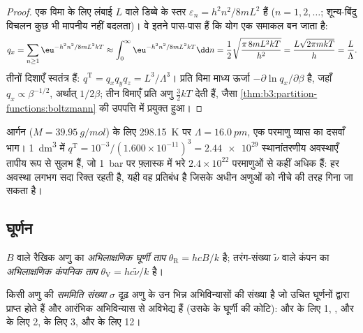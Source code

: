 \begin{proof}
एक विमा के लिए लंबाई $L$ वाले डिब्बे के स्तर $\varepsilon_n = h^2n^2/8mL^2$ हैं
($n = 1, 2, \dots$; शून्य-बिंदु विचलन कुछ भी मापनीय नहीं बदलता)। वे इतने
पास-पास हैं कि योग एक समाकल बन जाता है:
\[
  q_x = \sum_{n\ge1}\eu^{-h^2n^2/8mL^2kT} \approx \int_0^\infty\eu^{-h^2n^2/8mL^2kT}\dd n
      = \frac12\sqrt{\frac{\pi\,8mL^2kT}{h^2}} = \frac{L\sqrt{2\pi mkT}}{h} = \frac{L}{\Lambda}.
\]
तीनों दिशाएँ स्वतंत्र हैं: $q^{\mathrm T} = q_xq_yq_z = L^3/\Lambda^3$। प्रति
विमा माध्य ऊर्जा $-\partial\ln q_x/\partial\beta$ है, जहाँ $q_x \propto \beta^{-1/2}$, अर्थात्
$1/2\beta$; तीन विमाएँ प्रति अणु $\frac32kT$ देती हैं, जैसा
\cref{thm:b3:partition-functions:boltzmann} की उपपत्ति में प्रयुक्त हुआ।
\end{proof}

\begin{example}[फ़्लास्क में आर्गन]\label{ex:b3:partition-functions:argon}
आर्गन ($M = \qty{39.95}{g/mol}$) के लिए \qty{298.15}{K} पर $\Lambda = \qty{16.0}{pm}$, एक
परमाणु व्यास का दसवाँ भाग। \qty{1}{dm^3} में $q^{\mathrm T} = 10^{-3}/(1.600\times10^{-11})^3 = \num{2.44e29}$
स्थानांतरणीय अवस्थाएँ तापीय रूप से सुलभ हैं, जो
\qty{1}{bar} पर फ़्लास्क में भरे $2.4\times10^{22}$ परमाणुओं से कहीं अधिक हैं: हर अवस्था लगभग सदा
रिक्त रहती है, यही वह प्रतिबंध है जिसके अधीन अणुओं को नीचे की तरह गिना जा सकता है।
\end{example}

\subsection*{घूर्णन}

\begin{definition}[अभिलाक्षणिक ताप]\label{def:b3:partition-functions:characteristic-temperature}
 $B$ वाले रैखिक अणु का \emph{अभिलाक्षणिक घूर्णी ताप}
$\theta_{\mathrm R} =
hcB/k$ है; तरंग-संख्या $\tilde\nu$ वाले कंपन का \emph{अभिलाक्षणिक कंपनिक ताप}
$\theta_{\mathrm V} =
hc\tilde\nu/k$ है।
\end{definition}

\begin{definition}[सममिति संख्या]\label{def:b3:partition-functions:symmetry-number}
किसी अणु की \emph{सममिति संख्या} $\sigma$ दृढ़ अणु के उन
भिन्न अभिविन्यासों की संख्या है जो उचित घूर्णनों द्वारा प्राप्त होते हैं और
आरंभिक अभिविन्यास से अविभेद्य हैं (उसके  के घूर्णी  की
कोटि):  और  के लिए 1, ,
 और  के लिए 2,  के लिए 3,  और  के लिए 12।
\end{definition}

